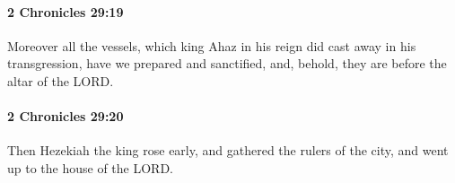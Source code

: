 		\paragraph{2 Chronicles 29:19} %
			\label{2CHRONICLES-29-19}

			Moreover all the vessels, which king Ahaz in his reign did cast away in his transgression, have we prepared and sanctified, and, behold, they are before the altar of the LORD.


		\paragraph{2 Chronicles 29:20} %
			\label{2CHRONICLES-29-20}

			Then Hezekiah the king rose early, and gathered the rulers of the city, and went up to the house of the LORD.


